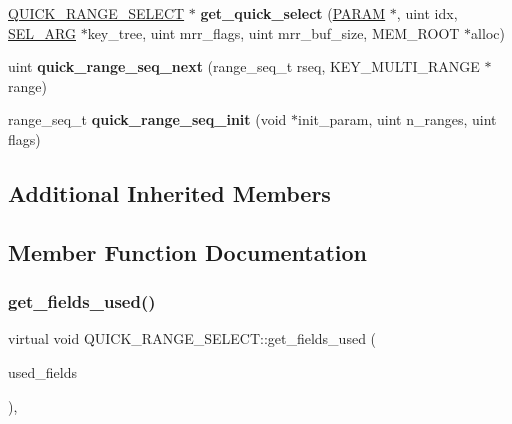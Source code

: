 \begin{DoxyCompactItemize}
\item 
\mbox{\label{classQUICK__RANGE__SELECT_a40d94a139bb5a4f3832b7b611ec52cc6}} 
\mbox{\hyperlink{classQUICK__RANGE__SELECT}{Q\+U\+I\+C\+K\+\_\+\+R\+A\+N\+G\+E\+\_\+\+S\+E\+L\+E\+CT}} $\ast$ {\bfseries get\+\_\+quick\+\_\+select} (\mbox{\hyperlink{classPARAM}{P\+A\+R\+AM}} $\ast$, uint idx, \mbox{\hyperlink{classSEL__ARG}{S\+E\+L\+\_\+\+A\+RG}} $\ast$key\+\_\+tree, uint mrr\+\_\+flags, uint mrr\+\_\+buf\+\_\+size, M\+E\+M\+\_\+\+R\+O\+OT $\ast$alloc)
\item 
\mbox{\label{classQUICK__RANGE__SELECT_a0e69f3a3005d77d7e779e5326e56ec26}} 
uint {\bfseries quick\+\_\+range\+\_\+seq\+\_\+next} (range\+\_\+seq\+\_\+t rseq, K\+E\+Y\+\_\+\+M\+U\+L\+T\+I\+\_\+\+R\+A\+N\+GE $\ast$range)
\item 
\mbox{\label{classQUICK__RANGE__SELECT_ac37903eb4cf07a4ec47ba77060d39579}} 
range\+\_\+seq\+\_\+t {\bfseries quick\+\_\+range\+\_\+seq\+\_\+init} (void $\ast$init\+\_\+param, uint n\+\_\+ranges, uint flags)
\end{DoxyCompactItemize}
\subsection*{Additional Inherited Members}


\subsection{Member Function Documentation}
\mbox{\label{classQUICK__RANGE__SELECT_a82d2dca80080416c5c9b7269d64111e5}} 
\subsubsection{\texorpdfstring{get\+\_\+fields\+\_\+used()}{get\_fields\_used()}}
{\footnotesize\ttfamily virtual void Q\+U\+I\+C\+K\+\_\+\+R\+A\+N\+G\+E\+\_\+\+S\+E\+L\+E\+C\+T\+::get\+\_\+fields\+\_\+used (\begin{DoxyParamCaption}\item[{M\+Y\+\_\+\+B\+I\+T\+M\+AP $\ast$}]{used\+\_\+fields }\end{DoxyParamCaption})\hspace{0.3cm}{\ttfamily [inline]}, {\ttfamily [virtual]}}

